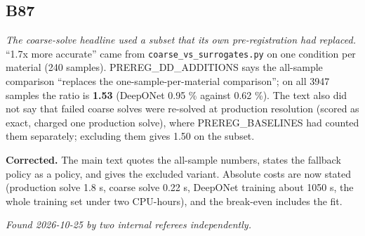 \documentclass[10pt]{article}
\begin{document}
\subsection*{B87}\label{led:B87}
\begin{description}[leftmargin=0pt,itemsep=1pt]
\item[Defect.] \emph{The coarse-solve headline used a subset that its own pre-registration had replaced.} ``1.7x more accurate'' came from \texttt{coarse\_vs\_surrogates.py} on one condition per material (240 samples). PREREG\_DD\_ADDITIONS says the all-sample comparison ``replaces the one-sample-per-material comparison''; on all 3947 samples the ratio is \textbf{1.53} (DeepONet 0.95 \% against 0.62 \%). The text also did not say that failed coarse solves were re-solved at production resolution (scored as exact, charged one production solve), where PREREG\_BASELINES had counted them separately; excluding them gives 1.50 on the subset.
\item[Resolution.] \textbf{Corrected.} The main text quotes the all-sample numbers, states the fallback policy as a policy, and gives the excluded variant. Absolute costs are now stated (production solve 1.8 s, coarse solve 0.22 s, DeepONet training about 1050 s, the whole training set under two CPU-hours), and the break-even includes the fit.
\item[Note.] \emph{Found 2026-10-25 by two internal referees independently.}
\end{description}
\end{document}
